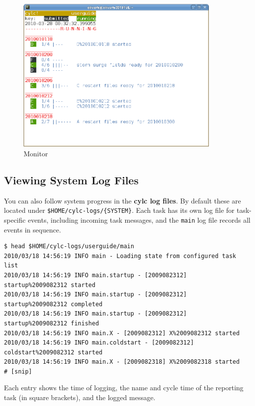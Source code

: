 \documentclass[11pt,a4paper]{article}
\begin{document}
\begin{figure} \label{fig-monitor-r} 
    \begin{center}
        \includegraphics[width=10cm]{monitor-2} 
    \end{center}
    \caption[Monitor]{\small Monitor }
\end{figure} 


\subsection{Viewing System Log Files}
\label{QuickViewingSystemLogFiles}

You can also follow system progress in the {\bf cylc log files}. By
default these are located under \lstinline=$HOME/cylc-logs/{SYSTEM}=.
Each task has its own log file for task-specific events, including 
incoming task messages, and the \lstinline=main= log file records all
events in sequence.

\lstset{language=}
\begin{lstlisting}
$ head $HOME/cylc-logs/userguide/main
2010/03/18 14:56:19 INFO main - Loading state from configured task list
2010/03/18 14:56:19 INFO main.startup - [2009082312] startup%2009082312 started
2010/03/18 14:56:19 INFO main.startup - [2009082312] startup%2009082312 completed
2010/03/18 14:56:19 INFO main.startup - [2009082312] startup%2009082312 finished
2010/03/18 14:56:19 INFO main.X - [2009082312] X%2009082312 started
2010/03/18 14:56:19 INFO main.coldstart - [2009082312] coldstart%2009082312 started
2010/03/18 14:56:19 INFO main.X - [2009082318] X%2009082318 started
# [snip]
\end{lstlisting}

Each entry shows the time of logging, the name and cycle time of the
reporting task (in square brackets), and the logged message.
\end{document}
